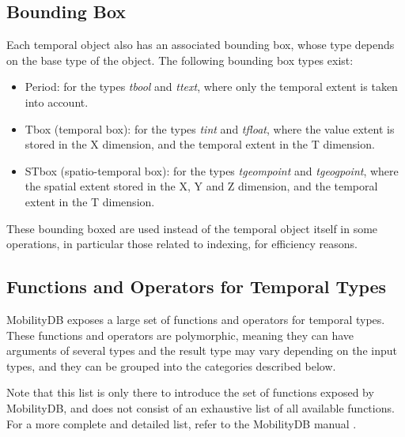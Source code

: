 \subsection{Bounding Box}
\label{section:mobilitydb_bbox}

Each temporal object also has an associated bounding box, whose type depends on the base type of the object. The following bounding box types exist:

\begin{itemize}
    \item Period: for the types \textit{tbool} and \textit{ttext}, where only the temporal extent is taken into account.
    \item Tbox (temporal box): for the types \textit{tint} and \textit{tfloat}, where the value extent is stored in the X dimension, and the temporal extent in the T dimension.
    \item STbox (spatio-temporal box): for the types \textit{tgeompoint} and \textit{tgeogpoint}, where the spatial extent stored in the X, Y and Z dimension, and the temporal extent in the T dimension.
\end{itemize}

These bounding boxed are used instead of the temporal object itself in some operations, in particular those related to indexing, for efficiency reasons.

\subsection{Functions and Operators for Temporal Types}
\label{section:mobilitydb_functions}

MobilityDB exposes a large set of functions and operators for temporal types. These functions and operators are polymorphic, meaning they can have arguments of several types and the result type may vary depending on the input types, and they can be grouped into the categories described below. 

Note that this list is only there to introduce the set of functions exposed by MobilityDB, and does not consist of an exhaustive list of all available functions. For a more complete and detailed list, refer to the MobilityDB manual \cite{mobiliydb_manual}.

